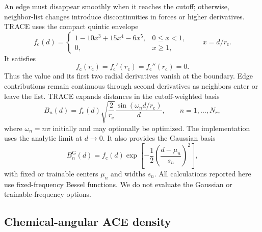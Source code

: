 \documentclass[aps,prx,preprint,notitlepage,superscriptaddress,nofootinbib,floatfix]{revtex4-2}
\begin{document}
An edge must disappear smoothly when it reaches the cutoff; otherwise, neighbor-list changes introduce discontinuities in forces or higher derivatives. TRACE uses the compact quintic envelope
\begin{equation}
 f_{\mathrm c}(d)=
 \begin{cases}
 1-10x^3+15x^4-6x^5, & 0\le x<1,\\
 0, & x\ge 1,
 \end{cases}
 \qquad x=d/r_{\mathrm c}.
 \label{eq:cutoff}
\end{equation}
It satisfies
\begin{equation}
 f_{\mathrm c}(r_{\mathrm c})=f_{\mathrm c}'(r_{\mathrm c})
 =f_{\mathrm c}''(r_{\mathrm c})=0.
 \label{eq:cutoff-smoothness}
\end{equation}
Thus the value and its first two radial derivatives vanish at the boundary. Edge contributions remain continuous through second derivatives as neighbors enter or leave the list. TRACE expands distances in the cutoff-weighted basis
\begin{equation}
 B_n(d)=f_{\mathrm c}(d)\sqrt{\frac{2}{r_{\mathrm c}}}
 \frac{\sin(\omega_n d/r_{\mathrm c})}{d},\qquad n=1,\ldots,N_r,
 \label{eq:bessel}
\end{equation}
where $\omega_n=n\pi$ initially and may optionally be optimized. The implementation uses the analytic limit at $d\rightarrow0$. It also provides the Gaussian basis
\begin{equation}
 B_n^{\mathrm G}(d)=f_{\mathrm c}(d)
 \exp\!\left[-\frac{1}{2}\left(\frac{d-\mu_n}{s_n}\right)^2\right],
 \label{eq:gaussian}
\end{equation}
with fixed or trainable centers $\mu_n$ and widths $s_n$. All calculations reported here use fixed-frequency Bessel functions. We do not evaluate the Gaussian or trainable-frequency options.

\subsection{Chemical-angular ACE density}
\end{document}
